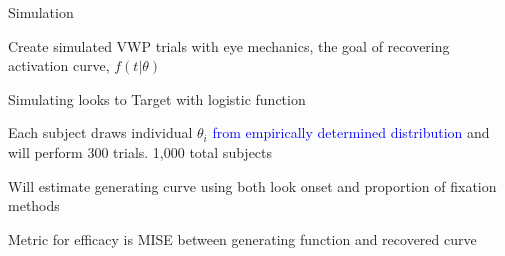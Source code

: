 \documentclass{beamer}
\newcommand{\vp}{\vspace{2mm}}
\providecommand{\cn}[1]{\textcolor{blue}{#1}}
\begin{document}
\begin{frame}{Simulation}

Create simulated VWP trials with eye mechanics, the goal of recovering activation curve, $f(t|\theta)$ \vp 

Simulating looks to Target with logistic function \vp

Each subject draws individual $\theta_i$ \cn{from empirically determined distribution} and will perform 300 trials. 1,000 total subjects \vp 

Will estimate generating curve using both look onset and proportion of fixation methods \vp

Metric for efficacy is MISE between generating function and recovered curve
\end{frame}


%
%
%
%
%
%
\end{document}
